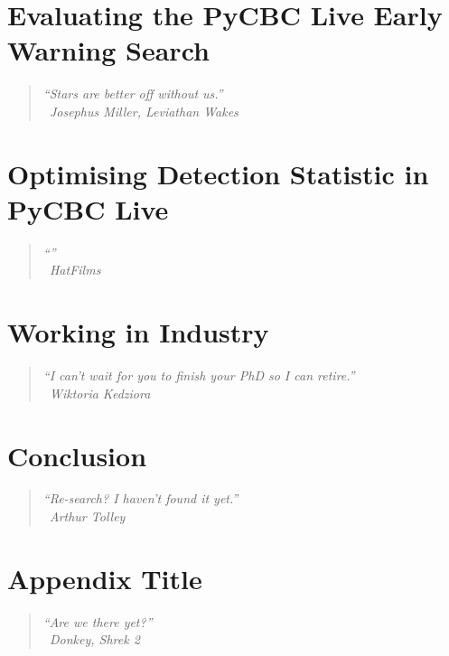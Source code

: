 \documentclass[12pt,twoside]{report} %
\newcommand{\chapterquote}[2]{
  \begin{quote}
    \color{mediumgray}\itshape #1 \\[1ex] %
    \raggedleft %
    \textemdash\ #2
  \end{quote}
}
\begin{document}
\chapter[Evaluating the PyCBC Live Early Warning Search]{\label{chapter:6-earlywarning}Evaluating the PyCBC Live Early Warning Search}
\chapterquote{``Stars are better off without us.''}{Josephus Miller, Leviathan Wakes}
% 

\chapter[Optimising Detection Statistic in PyCBC Live]{\label{chaper:7-snr-optimizer}Optimising Detection Statistic in PyCBC Live}
\chapterquote{``''}{HatFilms}


\chapter[Working in Industry]{\label{chapter:8-industry}Working in Industry}
\chapterquote{``I can't wait for you to finish your PhD so I can retire.''}{Wiktoria Kedziora}


\chapter[Conclusion]{\label{chapter:conclusion}Conclusion}
\chapterquote{``Re-search? I haven't found it yet.''}{Arthur Tolley}


\appendix
\chapter[Appendix]{Appendix Title}
\chapterquote{``Are we there yet?''}{Donkey, Shrek 2}


% 
% 
\nocite{*}
\printbibliography
\end{document}
